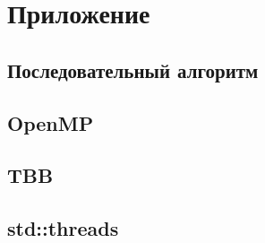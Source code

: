 \documentclass{report}
\begin{document}
\newpage

\section*{Приложение}
\subsection*{Последовательный алгоритм}




\subsection*{OpenMP}




\subsection*{TBB}




\subsection*{std::threads}



\end{document}
